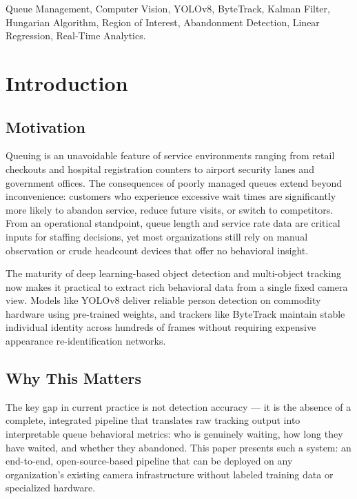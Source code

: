 \documentclass[journal, twocolumn]{IEEEtran}
\begin{document}
\begin{IEEEkeywords}
Queue Management, Computer Vision, YOLOv8, ByteTrack, Kalman Filter, Hungarian Algorithm, Region of Interest, Abandonment Detection, Linear Regression, Real-Time Analytics.
\end{IEEEkeywords}

\section{Introduction}

\subsection{Motivation}
Queuing is an unavoidable feature of service environments ranging from retail checkouts and hospital registration counters to airport security lanes and government offices. The consequences of poorly managed queues extend beyond inconvenience: customers who experience excessive wait times are significantly more likely to abandon service, reduce future visits, or switch to competitors. From an operational standpoint, queue length and service rate data are critical inputs for staffing decisions, yet most organizations still rely on manual observation or crude headcount devices that offer no behavioral insight.

The maturity of deep learning-based object detection and multi-object tracking now makes it practical to extract rich behavioral data from a single fixed camera view. Models like YOLOv8 \cite{yolov8} deliver reliable person detection on commodity hardware using pre-trained weights, and trackers like ByteTrack \cite{bytetrack2022} maintain stable individual identity across hundreds of frames without requiring expensive appearance re-identification networks.

\subsection{Why This Matters}
The key gap in current practice is not detection accuracy — it is the absence of a complete, integrated pipeline that translates raw tracking output into interpretable queue behavioral metrics: who is genuinely waiting, how long they have waited, and whether they abandoned. This paper presents such a system: an end-to-end, open-source-based pipeline that can be deployed on any organization's existing camera infrastructure without labeled training data or specialized hardware.
\end{document}
